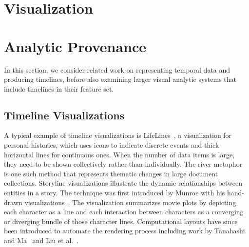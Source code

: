 \section{Visualization}
\section{Analytic Provenance}


In this section, we consider related work on representing temporal data and producing timelines, before also examining larger visual analytic systems that include timelines in their feature set.

\subsection{Timeline Visualizations}
A typical example of timeline visualizations is LifeLines~\cite{Plaisant1996a}, a visualization for personal histories, which uses icons to indicate discrete events and thick horizontal lines for continuous ones. When the number of data items is large, they need to be shown collectively rather than individually. The river metaphor~\cite{Havre2002} is one such method that represents thematic changes in large document collections. Storyline visualizations illustrate the dynamic relationships between entities in a story. The technique was first introduced by Munroe with his hand-drawn visualizations~\cite{Munroe2009}. The visualization summarizes movie plots by depicting each character as a line and each interaction between characters as a converging or diverging bundle of those character lines. Computational layouts have since been introduced to automate the rendering process including work by Tanahashi and Ma~\cite{Tanahashi2012} and Liu et al.~\cite{Liu2013}. 

